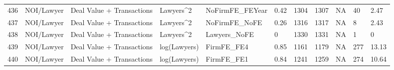 \documentclass{article}
\begin{document}
\begin{table}[H]
\begin{tabular}{rllllllllll}
  436 & NOI/Lawyer & Deal Value + Transactions & Lawyers^2 & NoFirmFE\_FEYear & 0.42 & 1304 & 1307 & NA & 40 & 2.47 \\
  437 & NOI/Lawyer & Deal Value + Transactions & Lawyers^2 & NoFirmFE\_NoFE & 0.26 & 1316 & 1317 & NA & 8 & 2.43 \\
  438 & NOI/Lawyer & Deal Value + Transactions & Lawyers^2 & Lawyers\_NoFE & 0 & 1330 & 1331 & NA & 1 & 0 \\
  439 & NOI/Lawyer & Deal Value + Transactions & log(Lawyers) & FirmFE\_FE4 & 0.85 & 1161 & 1179 & NA & 277 & 13.13 \\
  440 & NOI/Lawyer & Deal Value + Transactions & log(Lawyers) & FirmFE\_FE1 & 0.84 & 1241 & 1259 & NA & 274 & 10.64 \\
   \hline
\end{tabular}
\end{table}
\end{document}
